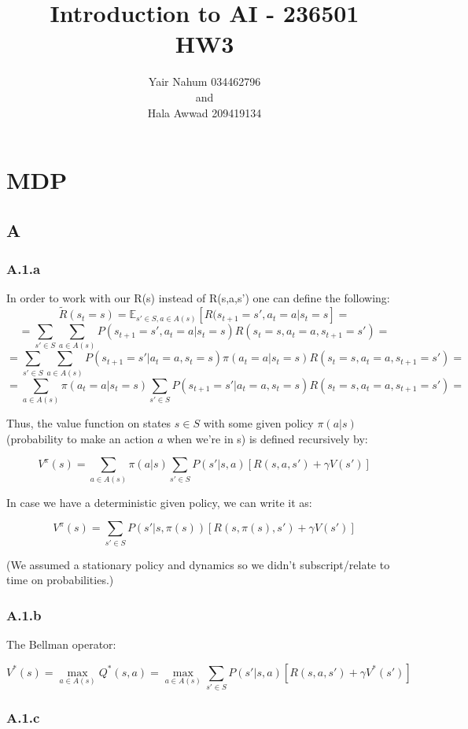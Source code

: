 \documentclass[12pt]{article}
\title{Introduction to AI - 236501\\HW3}
\author{Yair Nahum 034462796\\and\\Hala Awwad 209419134 }
\begin{document}
\maketitle


\section*{MDP}

\subsection*{A}

\subsubsection*{A.1.a}

In order to work with our R(s) instead of R(s,a,s') one can define the following:
$$\tilde R(s_t=s) = \mathbb {E}_{s'\in S, a\in A(s)}[R(s_{t+1}=s',a_t=a|s_t=s]=$$
$$= \sum_{s'\in S} \sum_{a\in A(s)} P(s_{t+1}=s',a_t=a|s_t=s) R(s_t=s,a_t=a,s_{t+1}=s') = $$
$$= \sum_{s'\in S} \sum_{a\in A(s)} P(s_{t+1}=s'|a_t=a,s_t=s)\pi(a_t=a|s_t=s) R(s_t=s,a_t=a,s_{t+1}=s') = $$
$$= \sum_{a\in A(s)} \pi(a_t=a|s_t=s) \sum_{s'\in S} P(s_{t+1}=s'|a_t=a,s_t=s) R(s_t=s,a_t=a,s_{t+1}=s') = $$

Thus, the value function on states $s\in S$ with some given policy $\pi(a|s)$ (probability to make an action $a$ when we're in s) is defined recursively by:

$$V^{\pi}(s) = \sum_{a\in A(s)} \pi(a|s) \sum_{s'\in S} P(s'|s,a) [R(s,a,s') + \gamma V(s')]$$

In case we have a deterministic given policy, we can write it as:

$$V^{\pi}(s) = \sum_{s'\in S} P(s'|s,\pi(s)) [R(s,\pi(s),s') + \gamma V(s')]$$

(We assumed a stationary policy and dynamics so we didn't subscript/relate to time on probabilities.)

\subsubsection*{A.1.b}

The Bellman operator:

$$V^*(s) = \max_{a\in A(s)}Q^*(s,a) = \max_{a\in A(s)} \sum_{s'\in S} P(s'|s,a) [R(s,a,s') + \gamma V^*(s')]$$

\subsubsection*{A.1.c}
\end{document}
